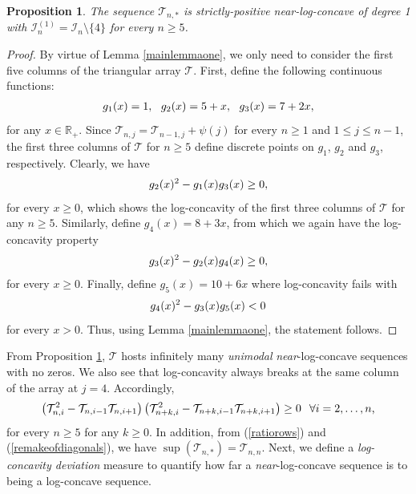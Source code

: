 \documentclass[a4paper,12pt]{article}
\newtheorem{prop}[thm]{Proposition}
\def\R{\mathbb{R}}
\def\T{\mathcal{T}}
\begin{document}
\begin{prop}
\label{propnearlogconcave}
The sequence $\T_{n,*}$ is strictly-positive \emph{near}-log-concave of degree 1 with $\mathcal{I}_{n}^{(1)} = \mathcal{I}_{n}\setminus\{4\}$ for every $n\geq 5$.
\end{prop}
\begin{proof}
By virtue of Lemma \ref{mainlemmaone}, we only need to consider the first five columns of the triangular array $\T$. First, define the following continuous functions: 
\begin{align}
g_1(x) = 1, \,\,\,\, g_2(x) = 5 + x, \,\,\,\, g_3(x) = 7 + 2x, \notag
\end{align}
for any $x\in\R_+$. Since $\T_{n,j} = \T_{n-1,j} + \psi(j)$ for every $n \geq 1$ and $1 \leq j \leq n-1$, the first three columns of $\T$ for $n\geq 5$ define discrete points on $g_1$, $g_2$ and $g_3$, respectively. Clearly, we have 
\begin{align}
g_2(x)^2 - g_1(x)g_3(x) \geq 0, \notag 
\end{align}
for every $x\geq 0$, which shows the log-concavity of the first three columns of $\T$ for any $n\geq 5$. Similarly, define $g_4(x) = 8 + 3x$, from which we again have the log-concavity property 
\begin{align}
g_3(x)^2 - g_2(x)g_4(x) \geq 0, \notag 
\end{align}
for every $x\geq 0$. Finally, define $g_5(x) = 10 + 6x$ where log-concavity fails with 
\begin{align}
g_4(x)^2 - g_3(x)g_5(x) < 0 \notag 
\end{align}
for every $x > 0$. Thus, using Lemma \ref{mainlemmaone}, the statement follows.
\end{proof}
From Proposition \ref{propnearlogconcave}, $\T$ hosts infinitely many \emph{unimodal} \emph{near}-log-concave sequences with no zeros. We also see that log-concavity always breaks at the same column of the array at $j=4$. Accordingly,
\begin{align}
\left( \T^2_{n,i} - \T_{n,i-1}\T_{n,i+1} \right)\left( \T^2_{n+k,i} - \T_{n+k,i-1}\T_{n+k,i+1} \right) \geq 0 \hspace{0.1in} \text{$\forall i=2,\ldots,n$,} \notag
\end{align}
for every $n\geq 5$ for any $k\geq 0$. In addition, from (\ref{ratiorows}) and (\ref{remakeofdiagonals}), we have $\sup(\T_{n,*}) = \T_{n,n}$. Next, we define a \emph{log-concavity deviation} measure to quantify how far a \emph{near}-log-concave sequence is to being a log-concave sequence.
\end{document}
